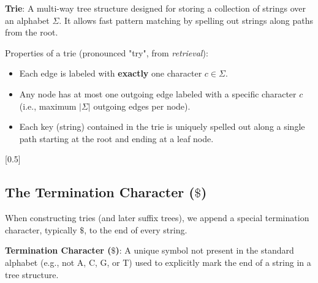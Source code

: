 \begin{important}
    \textbf{Trie}: A multi-way tree structure designed for storing a collection of strings over an alphabet \(\Sigma\). It allows fast pattern matching by spelling out strings along paths from the root.
\end{important}

Properties of a trie (pronounced "try", from \textit{retrieval}):
\begin{itemize}
    \item Each edge is labeled with \textbf{exactly} one character \(c \in \Sigma\).
    \item Any node has at most one outgoing edge labeled with a specific character \(c\) (i.e., maximum \(|\Sigma|\) outgoing edges per node).
    \item Each key (string) contained in the trie is uniquely spelled out along a single path starting at the root and ending at a leaf node.
\end{itemize}


[0.5]

\subsection{The Termination Character (\texorpdfstring{\(\$\)}{\$})}

When constructing tries (and later suffix trees), we append a special termination character, typically \(\$\), to the end of every string.

\begin{important}
    \textbf{Termination Character (\(\$\))}: A unique symbol not present in the standard alphabet (e.g., not A, C, G, or T) used to explicitly mark the end of a string in a tree structure.
\end{important}

